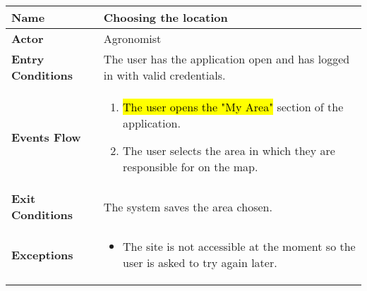 
\begin{center}
\renewcommand{\arraystretch}{1.25}
\begin{tabular}{|l|>{\raggedright\arraybackslash}m{12cm}|}

    \hline
    \textbf{Name} & Choosing the location\\
    \hline
   	\textbf{Actor} & Agronomist\\
    \hline
    \textbf{Entry Conditions} & The user has the application open and has logged in with valid credentials.\\
    \hline
    \textbf{Events Flow} & \begin{enumerate}
            \item \hl{The user opens the "My Area"} section of the application.
            \item The user selects the area in which they are responsible for on the map.
       \end{enumerate}\\
    \hline
    \textbf{Exit Conditions} & The system saves the area chosen.\\
    \hline
    \textbf{Exceptions} & 
        \begin{itemize}
          \item The site is not accessible at the moment so the user is asked to try again later.
        \end{itemize}
     \\
    \hline
\end{tabular}
\end{center}